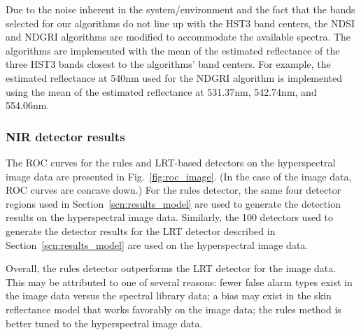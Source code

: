 \documentclass[10pt,journal,cspaper,compsoc]{IEEEtran}
\begin{document}

Due to the noise inherent in the system/environment and the fact that the bands selected for our algorithms do not line up with 
the HST3 band centers, the NDSI and NDGRI algorithms are modified to accommodate the available spectra.  The algorithms 
are implemented with the mean of the estimated reflectance of the three HST3 bands closest to the algorithms' band centers.  
For example, the estimated reflectance at 540nm used for the NDGRI algorithm is implemented using the mean of the estimated 
reflectance at 531.37nm, 542.74nm, and 554.06nm.  

\subsubsection{NIR detector results}
The ROC curves for the rules and LRT-based detectors on the hyperspectral image data are presented 
in Fig.~\ref{fig:roc_image}. (In the case of the image data, ROC curves are concave down.)  For the 
rules detector, the same four detector regions used in Section~\ref{scn:results_model} are used 
to generate the detection results on the hyperspectral image data.  Similarly, the 100 detectors used 
to generate the detector results for the LRT detector described in Section~\ref{scn:results_model} are 
used on the hyperspectral image data.

Overall, the rules detector outperforms the LRT detector for the image data.  This may be attributed 
to one of several reasons: fewer false alarm types exist in the image data versus the spectral library data; 
a bias may exist in the skin reflectance model that works favorably on the image data; the rules method is 
better tuned to the hyperspectral image data.
\end{document}
